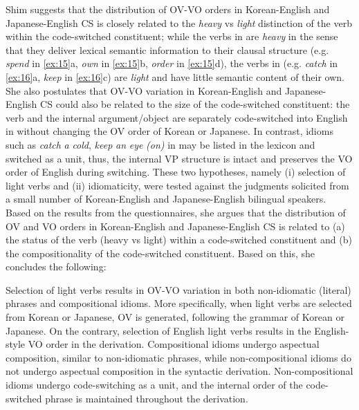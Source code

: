 Shim suggests that the distribution of \ac{OV}-\ac{VO} orders in Korean-English and Japanese-English \ac{CS} is closely related to the \textit{heavy} vs \textit{light} distinction of the verb within the code-switched constituent; while the verbs in  are \textit{heavy} in the sense that they deliver lexical semantic information to their clausal structure (e.g. \textit{spend} in \ref{ex:15}a, \textit{own} in \ref{ex:15}b, \textit{order} in \ref{ex:15}d), the verbs in  (e.g. \textit{catch} in \ref{ex:16}a, \textit{keep} in \ref{ex:16}c) are \textit{light} and have little semantic content of their own. She also postulates that \ac{OV}-\ac{VO} variation in Korean-English and Japanese-English \ac{CS} could also be related to the size of the code-switched constituent: the verb and the internal argument/object are separately code-switched into English in  without changing the \ac{OV} order of Korean or Japanese. In contrast, idioms such as \textit{catch} \textit{a} \textit{cold}, \textit{keep} \textit{an} \textit{eye} \textit{(on)} in  may be listed in the lexicon and switched as a unit, thus, the internal \ac{VP} structure is intact and preserves the  \ac{VO} order of English during switching. These two hypotheses, namely (i) selection of light verbs and (ii) idiomaticity, were tested against the judgments solicited from a small number of Korean-English and Japanese-English bilingual speakers. Based on the results from the questionnaires, she argues that the distribution of \ac{OV} and  \ac{VO} orders in Korean-English and Japanese-English \ac{CS} is related to (a) the status of the verb (heavy vs light) within a code-switched constituent and (b) the compositionality of the code-switched constituent. Based on this, she concludes the following:

\begin{exe}
\ex\label{ex:17}
\begin{xlist}
    \ex Selection of light verbs results in \ac{OV}-\ac{VO} variation in both non-id\-i\-o\-mat\-ic (literal) phrases and compositional idioms. More specifically, when light verbs are selected from Korean or Japanese, \ac{OV} is generated, following the grammar of Korean or Japanese. On the contrary, selection of English light verbs results in the English-style  \ac{VO} order in the derivation.
    \ex Compositional idioms undergo aspectual composition, similar to non-idiomatic phrases, while non-compositional idioms do not undergo aspectual composition in the syntactic derivation.\footnotemark  
    \ex Non-compositional idioms undergo code-switching as a unit, and the internal order of the code-switched phrase is maintained throughout the derivation.
\end{xlist}
\end{exe}

